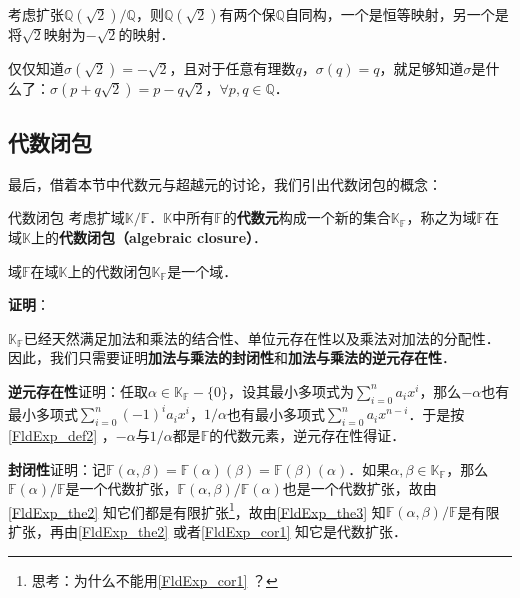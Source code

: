 \begin{example}{}
考虑扩张$\mathbb{Q}(\sqrt{2})/\mathbb{Q}$，则$\mathbb{Q}(\sqrt{2})$有两个保$\mathbb{Q}$自同构，一个是恒等映射，另一个是将$\sqrt{2}$映射为$-\sqrt{2}$的映射．

仅仅知道$\sigma(\sqrt{2})=-\sqrt{2}$，且对于任意有理数$q$，$\sigma(q)=q$，就足够知道$\sigma$是什么了：$\sigma(p+q\sqrt{2})=p-q\sqrt{2}$，$\forall p, q\in\mathbb{Q}$．
\end{example}








\subsection{代数闭包}

最后，借着本节中代数元与超越元的讨论，我们引出代数闭包的概念：


\begin{definition}{代数闭包}
考虑扩域$\mathbb{K}/\mathbb{F}$．$\mathbb{K}$中所有$\mathbb{F}$的\textbf{代数元}构成一个新的集合$\mathbb{K}_{\mathbb{F}}$，称之为域$\mathbb{F}$在域$\mathbb{K}$上的\textbf{代数闭包（algebraic closure）}．
\end{definition}

\begin{theorem}{}

域$\mathbb{F}$在域$\mathbb{K}$上的代数闭包$\mathbb{K}_{\mathbb{F}}$是一个域．

\end{theorem}

\textbf{证明}：

$\mathbb{K}_{\mathbb{F}}$已经天然满足加法和乘法的结合性、单位元存在性以及乘法对加法的分配性．因此，我们只需要证明\textbf{加法与乘法的封闭性}和\textbf{加法与乘法的逆元存在性}．

\textbf{逆元存在性}证明：任取$\alpha\in\mathbb{K}_{\mathbb{F}}-\{0\}$，设其最小多项式为$\sum_{i=0}^{n}a_ix^i$，那么$-\alpha$也有最小多项式$\sum_{i=0}^n(-1)^ia_ix^i$，$1/\alpha$也有最小多项式$\sum_{i=0}^na_ix^{n-i}$．于是按\autoref{FldExp_def2} ，$-\alpha$与$1/\alpha$都是$\mathbb{F}$的代数元素，逆元存在性得证．

\textbf{封闭性}证明：记$\mathbb{F}(\alpha, \beta)=\mathbb{F}(\alpha)(\beta)=\mathbb{F}(\beta)(\alpha)$．如果$\alpha,\beta\in\mathbb{K}_{\mathbb{F}}$，那么$\mathbb{F}(\alpha)/\mathbb{F}$是一个代数扩张，$\mathbb{F}(\alpha, \beta)/\mathbb{F}(\alpha)$也是一个代数扩张，故由\autoref{FldExp_the2} 知它们都是有限扩张\footnote{思考：为什么不能用\autoref{FldExp_cor1} ？}，故由\autoref{FldExp_the3} 知$\mathbb{F}(\alpha, \beta)/\mathbb{F}$是有限扩张，再由\autoref{FldExp_the2} 或者\autoref{FldExp_cor1} 知它是代数扩张．

